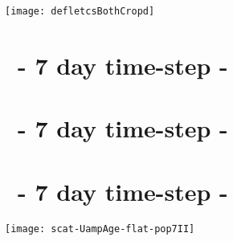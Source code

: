 \label{chap:results}

\begin{figure*}
	\texttt{[image: defletcsBothCropd]}
	\caption[\popSevenII tracks.]{Baseline-shifted tracks. Left: anticyclones. Right: cyclones. Color represents \textit{birth}-latitude. Thickness (hardly noticable) represents $\IQ$. Data is from a predecessor run to \popSevenII.}
	\label{fig:defletcsBothCropd}
\end{figure*}





\section{\mi~- 7 day time-step - \avi}
\label{section:aviI}


\section{\mii~- 7 day time-step - \avi}
\label{section:aviII}


\section{\mii~- 7 day time-step - \pop}
\label{section:pop7II}


%

\begin{marginfigure}
		\texttt{[image: scat-UampAge-flat-pop7II]}
		\caption{\RUN Small amplitude correlates with a short life and a broad translational speed spectrum. y-axis: translational speed $[cm/s]$, x-axis: amplitude $[cm]$, color: age [months].}
		\label{fig:scat-UampAge-flat-pop7II}
\end{marginfigure}


